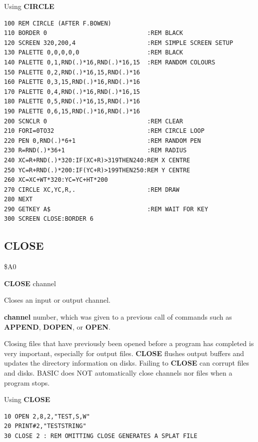 \begin{description}[leftmargin=2cm,style=nextline]
\item [Example:] Using {\bf CIRCLE}
\begin{tcolorbox}[colback=black,coltext=white]
\verbatimfont{\codefont}
\begin{verbatim}
100 REM CIRCLE (AFTER F.BOWEN)
110 BORDER 0                            :REM BLACK
120 SCREEN 320,200,4                    :REM SIMPLE SCREEN SETUP
130 PALETTE 0,0,0,0,0                   :REM BLACK
140 PALETTE 0,1,RND(.)*16,RND(.)*16,15  :REM RANDOM COLOURS
150 PALETTE 0,2,RND(.)*16,15,RND(.)*16
160 PALETTE 0,3,15,RND(.)*16,RND(.)*16
170 PALETTE 0,4,RND(.)*16,RND(.)*16,15
180 PALETTE 0,5,RND(.)*16,15,RND(.)*16
190 PALETTE 0,6,15,RND(.)*16,RND(.)*16
200 SCNCLR 0                            :REM CLEAR
210 FORI=0TO32                          :REM CIRCLE LOOP
220 PEN 0,RND(.)*6+1                    :REM RANDOM PEN
230 R=RND(.)*36+1                       :REM RADIUS
240 XC=R+RND(.)*320:IF(XC+R)>319THEN240:REM X CENTRE
250 YC=R+RND(.)*200:IF(YC+R)>199THEN250:REM Y CENTRE
260 XC=XC+WT*320:YC=YC+HT*200
270 CIRCLE XC,YC,R,.                    :REM DRAW
280 NEXT
290 GETKEY A$                           :REM WAIT FOR KEY
300 SCREEN CLOSE:BORDER 6
\end{verbatim}
\end{tcolorbox}
\end{description}


\newpage
\subsection{CLOSE}
\begin{description}[leftmargin=2cm,style=nextline]
\item [Token:] \$A0
\item [Format:] {\bf CLOSE} channel
\item [Usage:] Closes an input or output channel.

               {\bf channel} number, which was given to a previous
               call of commands such as {\bf APPEND}, {\bf DOPEN}, or {\bf OPEN}.

\item [Remarks:] Closing files that have previously been opened
               before a program has completed is
               very important, especially for output files.
               {\bf CLOSE} flushes output buffers and
               updates the directory information on disks.
               Failing to {\bf CLOSE} can corrupt files and disks.
               BASIC does NOT automatically close channels nor files
               when a program stops.

\item [Example:] Using {\bf CLOSE}
\begin{tcolorbox}[colback=black,coltext=white]
\verbatimfont{\codefont}
\begin{verbatim}
10 OPEN 2,8,2,"TEST,S,W"
20 PRINT#2,"TESTSTRING"
30 CLOSE 2 : REM OMITTING CLOSE GENERATES A SPLAT FILE
\end{verbatim}
\end{tcolorbox}
\end{description}

